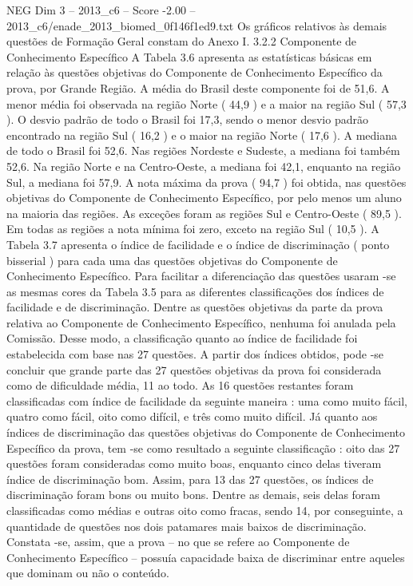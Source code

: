 \begin{textsample}{NEG Dim 3 – 2013\_c6 – Score -2.00 – 2013\_c6/enade\_2013\_biomed\_0f146f1ed9.txt}
Os gráficos relativos às demais questões de Formação Geral constam do Anexo I. 3.2.2 Componente de Conhecimento Específico A Tabela 3.6 apresenta as estatísticas básicas em relação às questões objetivas do Componente de Conhecimento Específico da prova, por Grande Região.
A média do Brasil deste componente foi de 51,6.
A menor média foi observada na região Norte ( 44,9 ) e a maior na região Sul ( 57,3 ).
O desvio padrão de todo o Brasil foi 17,3, sendo o menor desvio padrão encontrado na região Sul ( 16,2 ) e o maior na região Norte ( 17,6 ).
A mediana de todo o Brasil foi 52,6.
Nas regiões Nordeste e Sudeste, a mediana foi também 52,6.
Na região Norte e na Centro-Oeste, a mediana foi 42,1, enquanto na região Sul, a mediana foi 57,9.
A nota máxima da prova ( 94,7 ) foi obtida, nas questões objetivas do Componente de Conhecimento Específico, por pelo menos um aluno na maioria das regiões.
As exceções foram as regiões Sul e Centro-Oeste ( 89,5 ).
Em todas as regiões a nota mínima foi zero, exceto na região Sul ( 10,5 ).
A Tabela 3.7 apresenta o índice de facilidade e o índice de discriminação ( ponto bisserial ) para cada uma das questões objetivas do Componente de Conhecimento Específico.
Para facilitar a diferenciação das questões usaram -se as mesmas cores da Tabela 3.5 para as diferentes classificações dos índices de facilidade e de discriminação.
Dentre as questões objetivas da parte da prova relativa ao Componente de Conhecimento Específico, nenhuma foi anulada pela Comissão.
Desse modo, a classificação quanto ao índice de facilidade foi estabelecida com base nas 27 questões.
A partir dos índices obtidos, pode -se concluir que grande parte das 27 questões objetivas da prova foi considerada como de dificuldade média, 11 ao todo.
As 16 questões restantes foram classificadas com índice de facilidade da seguinte maneira : uma como muito fácil, quatro como fácil, oito como difícil, e três como muito difícil.
Já quanto aos índices de discriminação das questões objetivas do Componente de Conhecimento Específico da prova, tem -se como resultado a seguinte classificação : oito das 27 questões foram consideradas como muito boas, enquanto cinco delas tiveram índice de discriminação bom.
Assim, para 13 das 27 questões, os índices de discriminação foram bons ou muito bons.
Dentre as demais, seis delas foram classificadas como médias e outras oito como fracas, sendo 14, por conseguinte, a quantidade de questões nos dois patamares mais baixos de discriminação.
Constata -se, assim, que a prova – no que se refere ao Componente de Conhecimento Específico – possuía capacidade baixa de discriminar entre aqueles que dominam ou não o conteúdo.

\end{textsample}
